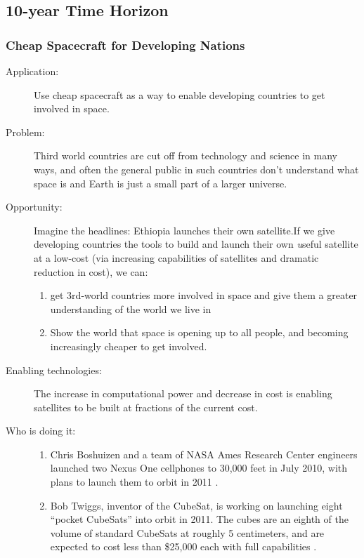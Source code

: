\subsection{10-year Time Horizon}


\subsubsection{Cheap Spacecraft for Developing Nations}

\begin{description}
\item[Application:] Use cheap spacecraft as a way to enable developing countries to get involved in space.

\item[Problem:] Third world countries are cut off from technology and science in many ways, and often the general public in such countries don't understand what space is and Earth is just a small part of a larger universe.

\item[Opportunity:]
Imagine the headlines: Ethiopia launches their own satellite.If we give developing countries the tools to build and launch their own {\emph useful} satellite at a low-cost (via increasing capabilities of satellites and dramatic reduction in cost), we can:
\begin{enumerate}
\item get 3rd-world countries more involved in space and give them a greater understanding of the world we live in
\item Show the world that space is opening up to all people, and becoming increasingly cheaper to get involved.
\end{enumerate}

\item[Enabling technologies:]
The increase in computational power and decrease in cost is enabling satellites to be built at fractions of the current cost.

\item[Who is doing it:]
\hfill\begin{enumerate}
\item Chris Boshuizen and a team of NASA Ames Research Center engineers launched two Nexus One cellphones to 30,000 feet in July 2010, with plans to launch them to orbit in 2011 \cite{McNally2010}.
\item Bob Twiggs, inventor of the CubeSat, is working on launching eight ``pocket CubeSats'' into orbit in 2011. The cubes are an eighth of the volume of standard CubeSats at roughly 5 centimeters, and are expected to cost less than \$25,000 each with full capabilities \cite{Patel2010}.
\end{enumerate}


\end{description}

